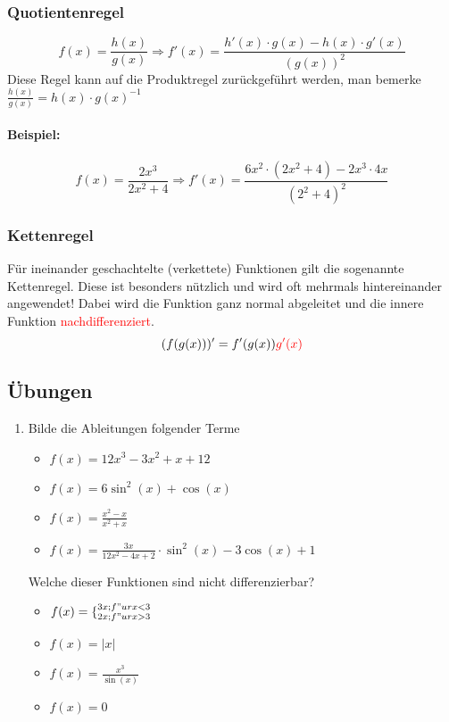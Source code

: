 \subsubsection{Quotientenregel}
\begin{equation*}
f(x)=\frac{h(x)}{g(x)} \Rightarrow f'(x)=\frac{h'(x) \cdot g(x)-h(x) \cdot g'(x)}{(g(x))^2}
\end{equation*}
Diese Regel kann auf die Produktregel zurückgeführt werden, man bemerke $\frac{h(x)}{g(x)} = h(x) \cdot g(x)^{-1}$

\paragraph{Beispiel:}
\begin{equation*}
f(x)=\frac{2x^3}{2x^2+4} \Rightarrow f'(x)=\frac{6x^2 \cdot (2x^2+4)-2x^3 \cdot 4x}{(2^2+4)^2}
\end{equation*}

\subsubsection{Kettenregel}
Für ineinander geschachtelte (verkettete) Funktionen gilt die sogenannte Kettenregel. Diese ist besonders nützlich und wird oft mehrmals hintereinander angewendet! Dabei wird die Funktion ganz normal abgeleitet und die innere Funktion \textcolor{red}{nachdifferenziert}.
\begin{equation*}
( f(g(x)) )'=f'(g(x))\textcolor{red}{g'(x)}
\end{equation*}


\subsection{Übungen}
\begin{enumerate}
\item Bilde die Ableitungen folgender Terme
\begin{itemize}
\item $f(x)=12x^3 - 3x^2 + x + 12$
\item $f(x)= 6 \sin^2(x) + \cos(x) $
\item $f(x)= \frac{x^2-x}{x^2+x}$
\item $f(x)= \frac{3x}{12x^2 - 4x + 2} \cdot \sin^2(x) - 3 \cos(x) + 1$
\end{itemize}
Welche dieser Funktionen sind nicht differenzierbar?
\begin{itemize}
\item $f(x)=\lbrace^{3x; f"ur x < 3}_{2x; f"ur x>3}$
\item $f(x)=|x|$
\item $f(x)= \frac{x^3}{\sin(x)}$
\item $f(x)= 0$
\end{itemize}
\end{enumerate}